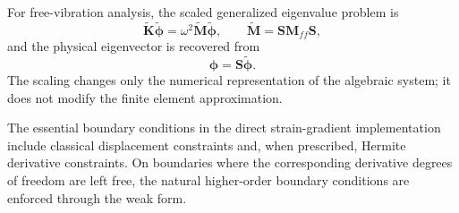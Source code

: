 \documentclass[final,3p,times,fleqn]{elsarticle}
\begin{document}
For free-vibration analysis, the scaled generalized eigenvalue problem is
\begin{equation}
\label{eq:scaled_eigenproblem}
\tilde{\mathbf{K}}\tilde{\boldsymbol{\phi}}
=
\omega^2
\tilde{\mathbf{M}}\tilde{\boldsymbol{\phi}},
\qquad
\tilde{\mathbf{M}}
=
\mathbf{S}\mathbf{M}_{ff}\mathbf{S},
\end{equation}
and the physical eigenvector is recovered from
\begin{equation}
\label{eq:eigenvector_recovery}
\boldsymbol{\phi}
=
\mathbf{S}\tilde{\boldsymbol{\phi}}.
\end{equation}
The scaling changes only the numerical representation of the algebraic
system; it does not modify the finite element approximation.

The essential boundary conditions in the direct strain-gradient
implementation include classical displacement constraints and, when
prescribed, Hermite derivative constraints. On boundaries where the
corresponding derivative degrees of freedom are left free, the natural
higher-order boundary conditions are enforced through the weak form.
\end{document}
